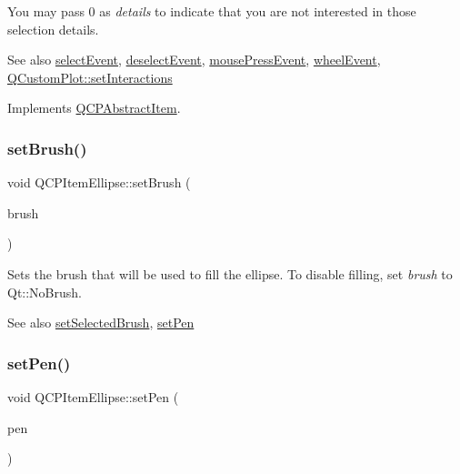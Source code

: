 You may pass 0 as {\itshape details} to indicate that you are not interested in those selection details.

\begin{DoxySeeAlso}{See also}
\hyperlink{class_q_c_p_abstract_item_aa4b969c58797f39c9c0b6c07c7869d17}{select\+Event}, \hyperlink{class_q_c_p_abstract_item_af9093798cb07a861dcc73f93ca16c0c1}{deselect\+Event}, \hyperlink{class_q_c_p_layerable_af6567604818db90f4fd52822f8bc8376}{mouse\+Press\+Event}, \hyperlink{class_q_c_p_layerable_a47dfd7b8fd99c08ca54e09c362b6f022}{wheel\+Event}, \hyperlink{class_q_custom_plot_a5ee1e2f6ae27419deca53e75907c27e5}{Q\+Custom\+Plot\+::set\+Interactions} 
\end{DoxySeeAlso}


Implements \hyperlink{class_q_c_p_abstract_item_ae41d0349d68bb802c49104afd100ba2a}{Q\+C\+P\+Abstract\+Item}.

\mbox{\label{class_q_c_p_item_ellipse_a49fc74e6965834e873d027d026def798}} 
\subsubsection{\texorpdfstring{set\+Brush()}{setBrush()}}
{\footnotesize\ttfamily void Q\+C\+P\+Item\+Ellipse\+::set\+Brush (\begin{DoxyParamCaption}\item[{const Q\+Brush \&}]{brush }\end{DoxyParamCaption})}

Sets the brush that will be used to fill the ellipse. To disable filling, set {\itshape brush} to Qt\+::\+No\+Brush.

\begin{DoxySeeAlso}{See also}
\hyperlink{class_q_c_p_item_ellipse_a9693501cfaa43a099655c75bed0dab3f}{set\+Selected\+Brush}, \hyperlink{class_q_c_p_item_ellipse_adb81a663ed2420fcfa011e49f678d1a6}{set\+Pen} 
\end{DoxySeeAlso}
\mbox{\label{class_q_c_p_item_ellipse_adb81a663ed2420fcfa011e49f678d1a6}} 
\subsubsection{\texorpdfstring{set\+Pen()}{setPen()}}
{\footnotesize\ttfamily void Q\+C\+P\+Item\+Ellipse\+::set\+Pen (\begin{DoxyParamCaption}\item[{const Q\+Pen \&}]{pen }\end{DoxyParamCaption})}

